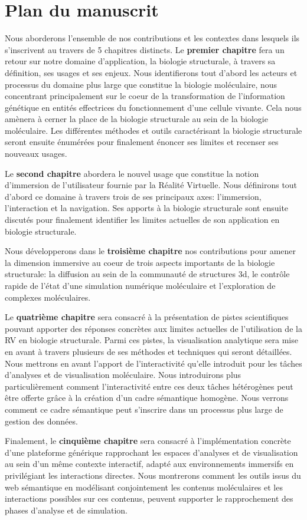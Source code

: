 \section*{Plan du manuscrit}

Nous aborderons l'ensemble de nos contributions et les contextes dans lesquels ils s'inscrivent au travers de 5 chapitres distincts. 
Le \textbf{premier chapitre} fera un retour sur notre domaine d'application, la biologie structurale, à travers sa définition, ses usages et ses enjeux. Nous identifierons tout d'abord les acteurs et processus du domaine plus large que constitue la biologie moléculaire, nous concentrant principalement sur le coeur de la transformation de l'information génétique en entités effectrices du fonctionnement d'une cellule vivante. Cela nous amènera à cerner la place de la biologie structurale au sein de la biologie moléculaire. Les différentes méthodes et outils caractérisant la biologie structurale seront ensuite énumérées pour finalement énoncer ses limites et recenser ses nouveaux usages.

Le \textbf{second chapitre} abordera le nouvel usage que constitue la notion d'immersion de l'utilisateur fournie par la Réalité Virtuelle. Nous définirons tout d'abord ce domaine à travers trois de ses principaux axes: l'immersion, l'interaction et la navigation. Ses apports à la biologie structurale sont ensuite discutés pour finalement identifier les limites actuelles de son application en biologie structurale.

Nous développerons dans le \textbf{troisième chapitre} nos contributions pour amener la dimension immersive au coeur de trois aspects importants de la biologie structurale: la diffusion au sein de la communauté de structures 3d, le contrôle rapide de l'état d'une simulation numérique moléculaire et l'exploration de complexes moléculaires.

Le \textbf{quatrième chapitre} sera consacré à la présentation de pistes scientifiques pouvant apporter des réponses concrètes aux limites actuelles de l'utilisation de la RV en biologie structurale. Parmi ces pistes, la visualisation analytique sera mise en avant à travers plusieurs de ses méthodes et techniques qui seront détaillées. Nous mettrons en avant l'apport de l'interactivité qu'elle introduit pour les tâches d'analyses et de visualisation moléculaire. Nous introduirons plus particulièrement comment l'interactivité entre ces deux tâches hétérogènes peut être offerte grâce à la création d'un cadre sémantique homogène. Nous verrons comment ce cadre sémantique peut s'inscrire dans un processus plus large de gestion des données.

Finalement, le \textbf{cinquième chapitre} sera consacré à l'implémentation concrète d'une plateforme générique rapprochant les espaces d'analyses et de visualisation au sein d'un même contexte interactif, adapté aux environnements immersifs en privilégiant les interactions directes. Nous montrerons comment les outils issus du web sémantique en modélisant conjointement les contenus moléculaires et les interactions possibles sur ces contenus, peuvent supporter le rapprochement des phases d'analyse et de simulation. 